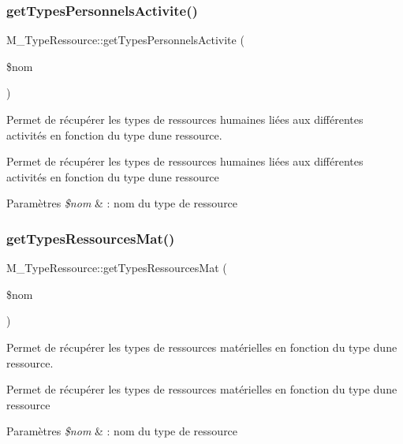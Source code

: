 \subsubsection{\texorpdfstring{get\+Types\+Personnels\+Activite()}{getTypesPersonnelsActivite()}}
{\footnotesize\ttfamily M\+\_\+\+Type\+Ressource\+::get\+Types\+Personnels\+Activite (\begin{DoxyParamCaption}\item[{}]{\$nom }\end{DoxyParamCaption})}



Permet de récupérer les types de ressources humaines liées aux différentes activités en fonction du type d\textquotesingle{}une ressource. 

Permet de récupérer les types de ressources humaines liées aux différentes activités en fonction du type d\textquotesingle{}une ressource 
\begin{DoxyParams}{Paramètres}
{\em \$nom} & \+: nom du type de ressource \\
\hline
\end{DoxyParams}
\mbox{\label{class_m___type_ressource_a2a68850fe5a03eee6cca5db64afd8da1}} 
\subsubsection{\texorpdfstring{get\+Types\+Ressources\+Mat()}{getTypesRessourcesMat()}}
{\footnotesize\ttfamily M\+\_\+\+Type\+Ressource\+::get\+Types\+Ressources\+Mat (\begin{DoxyParamCaption}\item[{}]{\$nom }\end{DoxyParamCaption})}



Permet de récupérer les types de ressources matérielles en fonction du type d\textquotesingle{}une ressource. 

Permet de récupérer les types de ressources matérielles en fonction du type d\textquotesingle{}une ressource 
\begin{DoxyParams}{Paramètres}
{\em \$nom} & \+: nom du type de ressource \\
\hline
\end{DoxyParams}
\mbox{\label{class_m___type_ressource_a39c1caa106754ac333387c7748bf5dc8}} 
